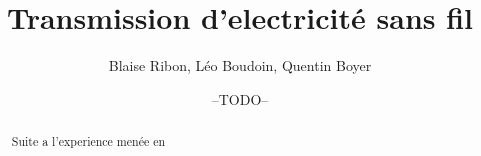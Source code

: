 ﻿\documentclass[11pt,a4paper]{report}
\begin{document}
\title{Transmission d'electricité sans fil}
\author{Blaise Ribon, Léo Boudoin, Quentin Boyer}
\date{--TODO--}
\maketitle

\begin{abstract}
	Suite a l'experience menée en 
\end{abstract}
\end{document}
